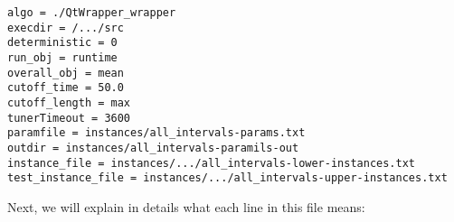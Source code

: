 \begin{shadedbox}
	\texttt{algo = ./QtWrapper\_wrapper\\
		execdir = /.../src \\
		deterministic = 0 \\
		run\_obj = runtime \\
		overall\_obj = mean \\
		cutoff\_time = 50.0 \\
		cutoff\_length = max \\
		tunerTimeout = 3600 \\
		paramfile = instances/all\_intervals-params.txt \\
		outdir = instances/all\_intervals-paramils-out \\
		instance\_file = instances/.../all\_intervals-lower-instances.txt \\
		test\_instance\_file = instances/.../all\_intervals-upper-instances.txt \\
	}
\end{shadedbox}

Next, we will explain in details what each line in this file means:


